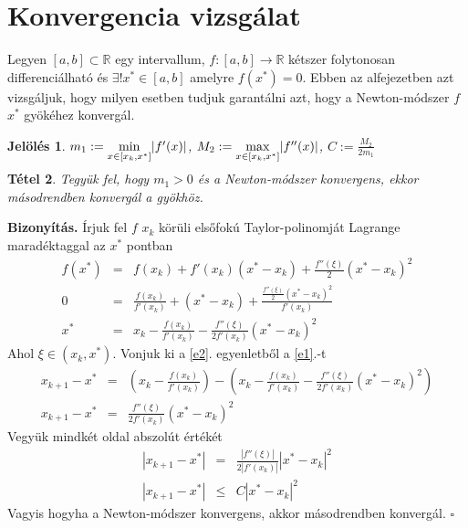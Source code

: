 \documentclass[a4paper,12pt]{report}
\newtheorem{Tet}{Tétel}[section]
\newtheorem{Jel}[Tet]{Jelölés}
\newenvironment{Biz}{\noindent \textbf{Bizonyítás. }}{ $\square$}
\begin{document}











		\section{Konvergencia vizsgálat}
			Legyen $[a,b]\subset{\mathbb R}$ egy intervallum, $f:[a,b]\to {\mathbb R}$ kétszer folytonosan differenciálható és $\exists !x^*\in[a,b]$ amelyre $f(x^*)=0$. Ebben az alfejezetben azt vizsgáljuk, hogy milyen esetben tudjuk garantálni azt, hogy a Newton-módszer $f$ $x^*$ gyökéhez konvergál.
			\begin{Jel}
				$m_1:=\smash{\displaystyle \min_{x \in [x_k,x^*]}} |f'(x)|$, $M_2:=\smash{\displaystyle \max_{x\in [x_k,x^*]}} |f''(x)|$, $C:=\frac{M_2}{2m_1}$
			\end{Jel}
			\begin{Tet}
			\label{t2} Tegyük fel, hogy $m_1>0$ és a Newton-módszer konvergens, ekkor másodrendben konvergál a gyökhöz.
			\end{Tet}
			\begin{Biz}
				Írjuk fel $f$ $x_k$ körüli elsőfokú Taylor-polinomját Lagrange maradéktaggal az $x^*$ pontban
				\begin{eqnarray}
					f(x^*)&=&f(x_k)+f'(x_k)(x^*-x_{k})+\frac{f''(\xi)}{2}(x^*-x_{k})^2 \\
					0&=&\frac{f(x_k)}{f'(x_k)}+(x^*-x_{k})+\frac{\frac{f''(\xi)}{2}(x^*-x_{k})^2}{f'(x_k)}\\
					\label{e1} x^*&=&x_k-\frac{f(x_k)}{f'(x_k)}-\frac{f''(\xi)}{2f'(x_k)}(x^*-x_{k})^2
				\end{eqnarray}
				Ahol $\xi \in (x_k,x^*)$. Vonjuk ki a \ref{e2}. egyenletből a \ref{e1}.-t
				\begin{eqnarray*}
					x_{k+1}-x^*&=&\left(x_k-\frac{f(x_k)}{f'(x_k)}\right) - \left(x_k-\frac{f(x_k)}{f'(x_k)}-\frac{f''(\xi)}{2f'(x_k)}(x^*-x_{k})^2\right)\\
					x_{k+1}-x^*&=&\frac{f''(\xi)}{2f'(x_k)}(x^*-x_{k})^2
				\end{eqnarray*}
				Vegyük mindkét oldal abszolút értékét
				\begin{eqnarray}
					|x_{k+1}-x^*|&=&\frac{|f''(\xi)|}{2|f'(x_k)|}|x^*-x_{k}|^2 \\
					|x_{k+1}-x^*| &\leq &C|x^*-x_k|^2 \label{e3}
				\end{eqnarray}
				Vagyis hogyha a Newton-módszer konvergens, akkor másodrendben konvergál.
			\end{Biz}
\end{document}

